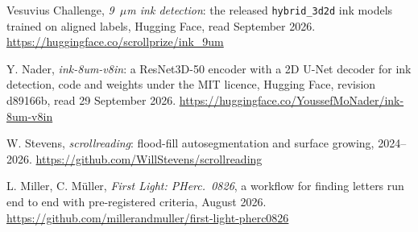 Vesuvius Challenge, \emph{9~$\mu$m ink detection}: the released \texttt{hybrid\_3d2d} ink models
  trained on aligned labels, Hugging Face, read September 2026.
  \url{https://huggingface.co/scrollprize/ink_9um}

 Y. Nader, \emph{ink-8um-v8in}: a ResNet3D-50 encoder with a 2D U-Net decoder for ink detection, code and
  weights under the MIT licence, Hugging Face, revision d89166b, read 29 September 2026.
  \url{https://huggingface.co/YoussefMoNader/ink-8um-v8in}

 W. Stevens, \emph{scrollreading}: flood-fill autosegmentation and surface growing, 2024--2026.
  \url{https://github.com/WillStevens/scrollreading}

 L. Miller, C. M\"uller, \emph{First Light: PHerc.\ 0826}, a workflow for finding letters run end to end
  with pre-registered criteria, August 2026. \url{https://github.com/millerandmuller/first-light-pherc0826}
